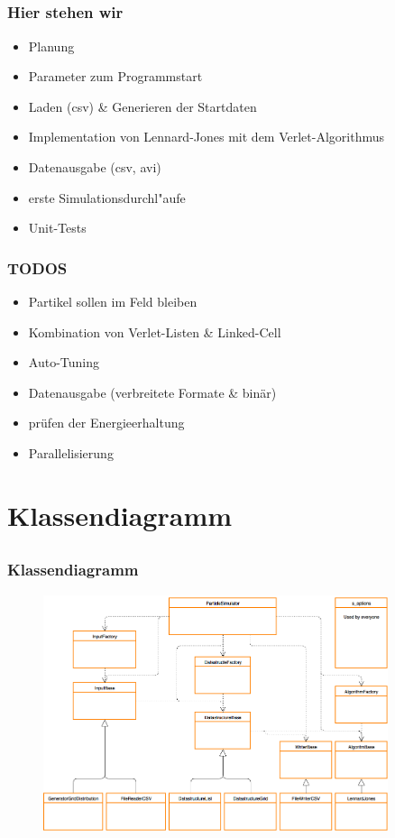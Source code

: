 \documentclass[compress]{beamer}
\begin{document}
\subsection{}
\begin{frame}%
	\frametitle{Hier stehen wir}
	\begin{itemize}
    	\item Planung
    	\item Parameter zum Programmstart
        \item Laden (csv) \& Generieren der Startdaten
        \item Implementation von Lennard-Jones mit dem Verlet-Algorithmus
        \item Datenausgabe (csv, avi)
		\item erste Simulationsdurchl"aufe
        \item Unit-Tests
	\end{itemize}
\end{frame}
\begin{frame}%
	\frametitle{TODOS}
	\begin{itemize}
        \item Partikel sollen im Feld bleiben
        \item Kombination von Verlet-Listen \& Linked-Cell
		\item  Auto-Tuning
        \item Datenausgabe (verbreitete Formate \& binär)
        \item prüfen der Energieerhaltung
        \item Parallelisierung
	\end{itemize}
\end{frame}
\section{Klassendiagramm}
\subsection{}
\begin{frame}%
	\frametitle{Klassendiagramm}
    \begin{figure}
		\begin{center}
			\includegraphics[width=0.9\textwidth]{ClassDiagram.png}
		\end{center}
	\end{figure}
\end{frame}
\end{document}
